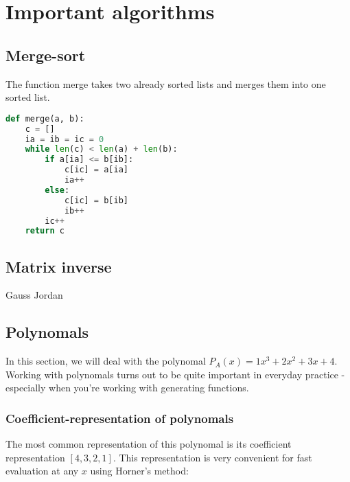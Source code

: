 \section{Important algorithms}

\subsection{Merge-sort}

The function merge takes two already sorted lists and merges them into one sorted list.

\begin{lstlisting}[language=python]
def merge(a, b):
    c = []
    ia = ib = ic = 0
    while len(c) < len(a) + len(b):
        if a[ia] <= b[ib]:
            c[ic] = a[ia]
            ia++
        else:
            c[ic] = b[ib]
            ib++
        ic++
    return c
\end{lstlisting}



\subsection{Matrix inverse}
Gauss Jordan

\subsection{Polynomals}

In this section, we will deal with the polynomal $P_A(x) = 1x^3 + 2x^2 + 3x + 4$. Working with polynomals turns out to be quite important in everyday practice - especially when you're working with generating functions.

\subsubsection{Coefficient-representation of polynomals}
The most common representation of this polynomal is its coefficient representation $[4, 3, 2, 1]$. This representation is very convenient for fast evaluation at any $x$ using Horner's method: 

